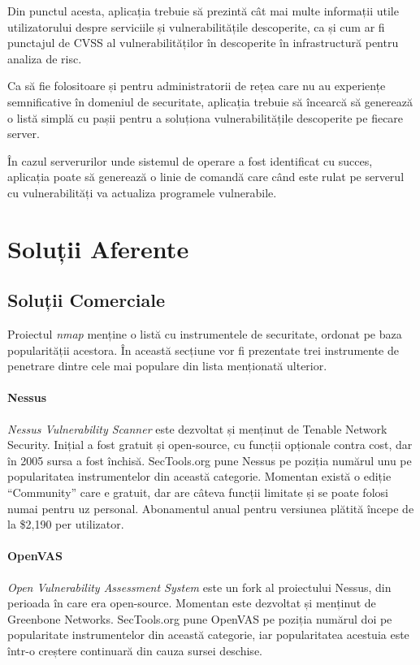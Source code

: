 	Din punctul acesta, aplicația trebuie să prezintă cât mai multe informații utile utilizatorului despre serviciile și vulnerabilitățile descoperite, ca și cum ar fi punctajul de CVSS al vulnerabilităților în descoperite în infrastructură pentru analiza de risc.
	
	Ca să fie folositoare și pentru administratorii de rețea care nu au experiențe semnificative în domeniul de securitate, aplicația trebuie să încearcă să generează o listă simplă cu pașii pentru a soluționa vulnerabilitățile descoperite pe fiecare server.
	
	În cazul serverurilor unde sistemul de operare a fost identificat cu succes, aplicația poate să generează o linie de comandă care când este rulat pe serverul cu vulnerabilități va actualiza programele vulnerabile.

\section*{Soluții Aferente}
	
\subsection*{Soluții Comerciale}
	
	Proiectul \textit{nmap} menține o listă cu instrumentele de securitate, ordonat pe baza popularității acestora\cite{sectools}. În această secțiune vor fi prezentate trei instrumente de penetrare dintre cele mai populare din lista menționată ulterior.
	
	\paragraph*{Nessus} \textit{Nessus Vulnerability Scanner}\cite{nessus} este dezvoltat și menținut de Tenable Network Security. Inițial a fost gratuit și open-source, cu funcții opționale contra cost, dar în 2005 sursa a fost închisă. SecTools.org pune Nessus pe poziția numărul unu pe popularitatea instrumentelor din această categorie. Momentan există o ediție ``Community'' care e gratuit, dar are câteva funcții limitate și se poate folosi numai pentru uz personal. Abonamentul anual pentru versiunea plătită începe de la \$2,190 per utilizator.
	
	\paragraph*{OpenVAS} \textit{Open Vulnerability Assessment System}\cite{openvas} este un fork al proiectului Nessus, din perioada în care era open-source. Momentan este dezvoltat și menținut de Greenbone Networks. SecTools.org pune OpenVAS pe poziția numărul doi pe popularitate instrumentelor din această categorie, iar popularitatea acestuia este într-o creștere continuară din cauza sursei deschise.
	
